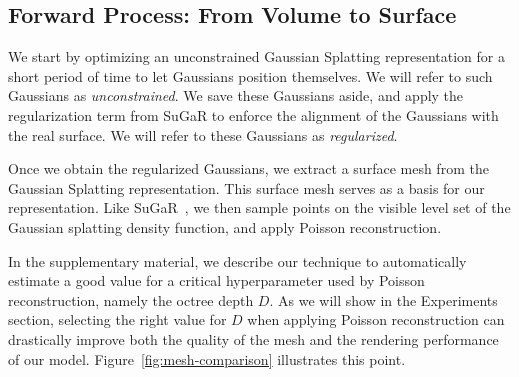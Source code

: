 \subsection{Forward Process: From Volume to Surface}
\label{subsec:forward-process}

We start by optimizing an unconstrained Gaussian Splatting representation for a short period of time to let Gaussians position themselves. We will refer to such Gaussians as \emph{unconstrained}. We save these Gaussians aside, and apply the regularization term from SuGaR to enforce the alignment of the Gaussians with the real surface. We will refer to these Gaussians as \emph{regularized}.

Once we obtain the regularized Gaussians, we extract a surface mesh from the Gaussian Splatting representation. This surface mesh serves as a basis for our representation. Like SuGaR~\cite{guedon2023sugar}, we then sample points on the visible level set of the Gaussian splatting density function, and apply Poisson reconstruction. 

In the supplementary material, we describe our technique to automatically estimate a good value for a critical hyperparameter used by Poisson reconstruction, namely the octree depth $D$. As we will show in the Experiments section, selecting the right value for $D$ when applying Poisson reconstruction can drastically improve both the quality of the mesh and the rendering performance of our model. Figure~\ref{fig:mesh-comparison} illustrates this point.



